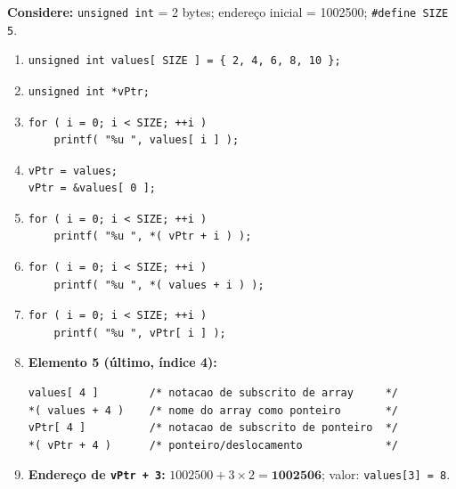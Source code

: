 \documentclass[12pt,a4paper]{article}
\begin{document}
\begin{respostabox}
\textbf{Considere:} \texttt{unsigned int} = 2 bytes; endereço inicial = 1002500;
\texttt{\#define SIZE 5}.

\begin{enumerate}[label=\textbf{\alph*)}]
\item \begin{lstlisting}
unsigned int values[ SIZE ] = { 2, 4, 6, 8, 10 };
\end{lstlisting}

\item \begin{lstlisting}
unsigned int *vPtr;
\end{lstlisting}

\item \begin{lstlisting}
for ( i = 0; i < SIZE; ++i )
    printf( "%u ", values[ i ] );
\end{lstlisting}

\item \begin{lstlisting}
vPtr = values;
vPtr = &values[ 0 ];
\end{lstlisting}

\item \begin{lstlisting}
for ( i = 0; i < SIZE; ++i )
    printf( "%u ", *( vPtr + i ) );
\end{lstlisting}

\item \begin{lstlisting}
for ( i = 0; i < SIZE; ++i )
    printf( "%u ", *( values + i ) );
\end{lstlisting}

\item \begin{lstlisting}
for ( i = 0; i < SIZE; ++i )
    printf( "%u ", vPtr[ i ] );
\end{lstlisting}

\item \textbf{Elemento 5 (último, índice 4):}
\begin{lstlisting}
values[ 4 ]        /* notacao de subscrito de array     */
*( values + 4 )    /* nome do array como ponteiro       */
vPtr[ 4 ]          /* notacao de subscrito de ponteiro  */
*( vPtr + 4 )      /* ponteiro/deslocamento             */
\end{lstlisting}

\item \textbf{Endereço de \texttt{vPtr + 3}:} $1002500 + 3 \times 2 = \mathbf{1002506}$;
valor: \texttt{values[3] = 8}.


\end{enumerate}
\end{respostabox}
\end{document}
